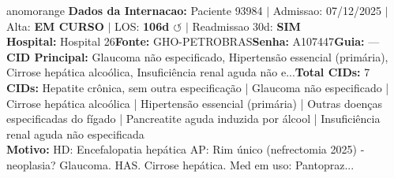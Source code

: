 \documentclass[a4paper,10pt]{article}
\begin{document}
\begin{anomalycard}[Internacao 157909 | GHO-PETROBRAS | ALTO (z=4.42)]{anomorange}
\textbf{Dados da Internacao:} Paciente 93984 $\mid$ Admissao: 07/12/2025 $\mid$ Alta: \textcolor{anomorange}{\textbf{EM CURSO}} $\mid$ LOS: \textbf{106d \textcolor{anomorange}{$\circlearrowleft$}} $\mid$ Readmissao 30d: \textcolor{anomred}{\textbf{SIM}}\\
\textbf{Hospital:} Hospital 26\quad\textbf{Fonte:} GHO-PETROBRAS\quad\textbf{Senha:} A107447\quad\textbf{Guia:} ---\\
\textbf{CID Principal:} {\small Glaucoma não especificado, Hipertensão essencial (primária), Cirrose hepática alcoólica, Insuficiência renal aguda não e...}\quad\textbf{Total CIDs:} 7\\

\textbf{CIDs:} {\scriptsize Hepatite crônica, sem outra especificação | Glaucoma não especificado | Cirrose hepática alcoólica | Hipertensão essencial (primária) | Outras doenças especificadas do fígado | Pancreatite aguda induzida por álcool | Insuficiência renal aguda não especificada}\\

\textbf{Motivo:} {\scriptsize HD: Encefalopatia hepática  AP: Rim único (nefrectomia 2025) - neoplasia? Glaucoma. HAS. Cirrose hepática. Med em uso: Pantopraz...}\\


\end{anomalycard}
\end{document}
